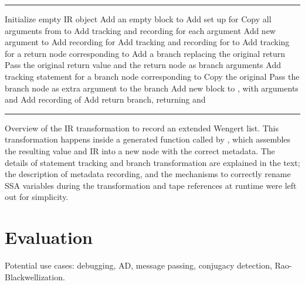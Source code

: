 \begin{algorithm}[p]
  \footnotesize
  \hrule
  \smallskip
  \begin{algorithmic}
    \State Initialize empty IR object 
    \Statex
    \State Add an empty block  to 
    \State Add set up for 
    \EndIf
    \Statex
    \State Copy all arguments from  to 
    \State Add tracking and recording for each argument
    \Statex
    \State Add new argument  to 
    \State Add recording for 
    \EndIf
    \Statex
    \State Add tracking and recording for  to 
    \EndFor
    \Statex
    \State Add tracking for a return node corresponding to 
    \State Add a branch replacing the original return
    \State Pass the original return value and the return node as branch arguments
    \Else
    \State Add tracking statement for a branch node corresponding to 
    \State Copy the original 
    \State Pass the branch node as extra argument to the branch
    \EndIf
    \EndFor
    \EndFor
    \Statex
    \State Add new block to , with  arguments  and 
    \State Add recording of 
    \State Add return branch, returning  and 
  \end{algorithmic}
  \smallskip
  \hrule
  \caption{Overview of the IR transformation to record an extended Wengert list.  This
    transformation happens inside a generated function called by \protect{}, which
    assembles the resulting value and IR into a new node with the correct metadata.  The details of
    statement tracking and branch transformation are explained in the text; the description of
    metadata recording, and the mechanisms to correctly rename SSA variables during the
    transformation and tape references at runtime were left out for
    simplicity.\label{alg:ir-transform}}
\end{algorithm}

\section{Evaluation}
\label{sec:irtracker-eval}

Potential use cases: debugging, AD, message passing, conjugacy detection, Rao-Blackwellization.

